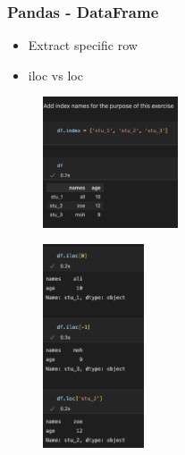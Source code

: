 \begin{frame}\frametitle{Pandas - DataFrame}
   \begin{minipage}{0.58\linewidth}
      \begin{itemize}
         \item Extract specific row
         \item iloc vs loc
      \end{itemize}
      \vspace{.5cm}
      \begin{figure}[H]
         \includegraphics[width=4cm]{../images/illustrations/pandas_index_names.png}
      \end{figure}
   \end{minipage}
   \begin{minipage}{0.38\linewidth}
      \begin{figure}[H]
         \includegraphics[width=3cm]{../images/illustrations/pandas_iloc_loc.png}
      \end{figure}
   \end{minipage}
\end{frame}


